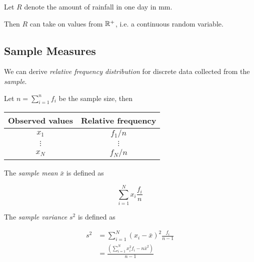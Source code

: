 \begin{example}[Rainfall]
    Let $R$ denote the amount of rainfall in one day in mm.

    Then $R$ can take on values from $\mathbb{R}^{+}$, i.e. a continuous random
    variable.
\end{example}

\subsection{Sample Measures}

\begin{definition}
    We can derive \textit{relative frequency distribution} for discrete data
    collected from the \textit{sample}.

    Let $n = \sum \limits_{i = 1}^{n} f_i$ be the sample size, then

    \begin{center}
        \begin{tabular}{c|c}
            Observed values & Relative frequency \\
            \hline
            $x_1$ & $f_1 / n$ \\
            $\vdots$ & $\vdots$ \\
            $x_N$ & $f_N / n$ \\
        \end{tabular}
    \end{center}
\end{definition}

\begin{definition}
    The \textit{sample mean} $\bar{x}$ is defined as

    \begin{equation}
        \sum \limits_{i=1}^{N} x_i \frac{f_i}{n}
    \end{equation}
\end{definition}

\begin{definition}
    The \textit{sample variance} $s^2$ is defined as

    \begin{align}
        s^2
        &= \sum \limits_{i=1}^{N} \left(
            x_i - \bar{x} \right)^2 \frac{f_i}{n - 1} \\
        &= \frac{\left( \sum
            \limits_{i=1}^{N} x_i^2 f_i - n \bar{x}^2 \right)}{n - 1}
    \end{align}
\end{definition}

